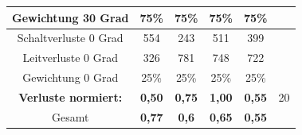 \begin{table}
\begin{tabular}{|c|c|c|c|c|c|}
	\hline
	Gewichtung 30 Grad & 75\% & 75\% & 75\% & 75\% &\\
	\hline
	Schaltverluste 0 Grad & 554 & 243 & 511 & 399& \\
	\hline
	Leitverluste 0 Grad & 326 & 781 & 748 & 722&\\
	\hline
	Gewichtung 0 Grad & 25\% & 25\% & 25\% & 25\%& \\
	\hline
	\bfseries Verluste normiert: &\bfseries 0,50 &\bfseries 0,75 &\bfseries 1,00 &\bfseries 0,55 &20\\
	\hline
	Gesamt &\bfseries 0,77 &\bfseries 0,6 &\bfseries 0,65 &\bfseries 0,55& \\
	\hline
\end{tabular}
\end{table}




